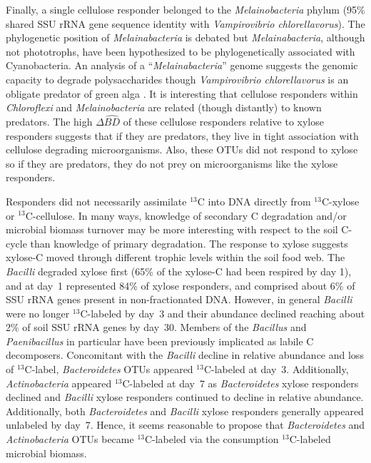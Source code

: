 Finally, a single cellulose responder belonged to the \textit{Melainobacteria}
phylum (95\% shared SSU rRNA gene sequence identity with \textit{Vampirovibrio
chlorellavorus}). The phylogenetic position of \textit{Melainabacteria} is
debated but \textit{Melainabacteria}, although not phototrophs, have been
hypothesized to be phylogenetically associated with Cyanobacteria. An analysis
of a ``\textit{Melainabacteria}'' genome \citep{Di_Rienzi_2013} suggests the
genomic capacity to degrade polysaccharides though \textit{Vampirovibrio
chlorellavorus} is an obligate predator of green alga \citep{gromov_1972}. It
is interesting that cellulose responders within \textit{Chloroflexi} and
\textit{Melainobacteria} are related (though distantly) to known predators. The
high $\Delta\hat{BD}$ of these cellulose responders relative to xylose
responders suggests that if they are predators, they live in tight association
with cellulose degrading microorganisms. Also, these OTUs did not respond to
xylose so if they are predators, they do not prey on microorganisms like the
xylose responders.

Responders did not necessarily assimilate $^{13}$C into DNA directly
from $^{13}$C-xylose or $^{13}$C-cellulose. In many ways, knowledge of
secondary C degradation and/or microbial biomass turnover may be more
interesting with respect to the soil C-cycle than knowledge of primary
degradation. The response to xylose suggests xylose-C moved through different
trophic levels within the soil food web. The \textit{Bacilli} degraded xylose
first (65\% of the xylose-C had been respired by day 1), and at day~1
represented 84\% of xylose responders, and comprised about 6\% of SSU rRNA
genes present in non-fractionated DNA. However, in general \textit{Bacilli}
were no longer $^{13}$C-labeled by day~3 and their abundance declined reaching
about 2\% of soil SSU rRNA genes by day~30. Members of the \textit{Bacillus}
\citep{Cleveland2007} and \textit{Paenibacillus} in particular
\citep{Verastegui_2014} have been previously implicated as labile
C decomposers. Concomitant with the \textit{Bacilli} decline in relative
abundance and loss of $^{13}$C-label, \textit{Bacteroidetes} OTUs appeared
$^{13}$C-labeled at day~3. Additionally, \textit{Actinobacteria} appeared
$^{13}$C-labeled at day~7 as \textit{Bacteroidetes} xylose responders declined
and \textit{Bacilli} xylose responders continued to decline in relative
abundance. Additionally, both \textit{Bacteroidetes} and \textit{Bacilli}
xylose responders generally appeared unlabeled by day~7. Hence, it seems
reasonable to propose that \textit{Bacteroidetes} and \textit{Actinobacteria}
OTUs became $^{13}$C-labeled via the consumption $^{13}$C-labeled microbial
biomass. 

